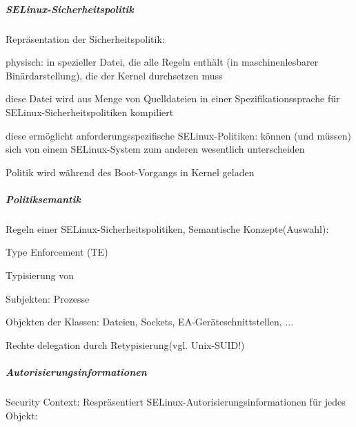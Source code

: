 \documentclass[a4paper]{article}
\begin{document}
\begin{multicols}{3}



    \subparagraph{SELinux-Sicherheitspolitik}

    Repräsentation der Sicherheitspolitik:

    \begin{itemize*}
        \item
        physisch: in spezieller Datei, die alle Regeln enthält (in
        maschinenlesbarer Binärdarstellung), die der Kernel durchsetzen muss
        \item
        diese Datei wird aus Menge von Quelldateien in einer
        Spezifikationssprache für SELinux-Sicherheitspolitiken kompiliert
        \item
        diese ermöglicht anforderungsspezifische SELinux-Politiken: können
        (und müssen) sich von einem SELinux-System zum anderen wesentlich
        unterscheiden
        \item
        Politik wird während des Boot-Vorgangs in Kernel geladen
    \end{itemize*}


    \subparagraph{Politiksemantik}

    Regeln einer SELinux-Sicherheitspolitiken, Semantische
    Konzepte(Auswahl):

    \begin{itemize*}
        \item
        Type Enforcement (TE)
        \item
        Typisierung von
        \begin{itemize*}
            \item Subjekten: Prozesse
            \item Objekten der Klassen: Dateien, Sockets, EA-Geräteschnittstellen, ...
        \end{itemize*}
        \item
        Rechte delegation durch Retypisierung(vgl. Unix-SUID!)
    \end{itemize*}


    \subparagraph{Autorisierungsinformationen}

    Security Context: Respräsentiert SELinux-Autorisierungsinformationen für
    jedes Objekt:


\end{multicols}
\end{document}
